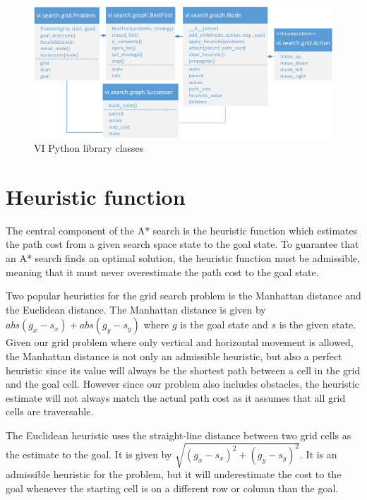 

\begin{figure}[p]
\includegraphics[width=\linewidth,scale=0.1]{images/vi_class_hierarchy}
\caption{VI Python library classes}
\label{figure:vi_classes}
\end{figure}

\section*{Heuristic function}

The central component of the A* search is the heuristic function which estimates the path cost from a given search space state to the goal state. To guarantee that an A* search finds an optimal solution, the heuristic function must be admissible, meaning that it must never overestimate the path cost to the goal state.

Two popular heuristics for the grid search problem is the Manhattan distance and the Euclidean distance. The Manhattan distance is given by $\textit{abs}(g_x - s_x) + \textit{abs}(g_y - s_y)$ where $g$ is the goal state and $s$ is the given state. Given our grid problem where only vertical and horizontal movement is allowed, the Manhattan distance is not only an admissible heuristic, but also a perfect heuristic since its value will always be the shortest path between a cell in the grid and the goal cell. However since our problem also includes obstacles, the heuristic estimate will not always match the actual path cost as it assumes that all grid cells are traversable.

The Euclidean heuristic uses the straight-line distance between two grid cells as the estimate to the goal. It is given by $\sqrt{(g_x - s_x)^2 + (g_y - s_y)^2}$. It is an admissible heuristic for the problem, but it will underestimate the cost to the goal whenever the starting cell is on a different row or column than the goal.

